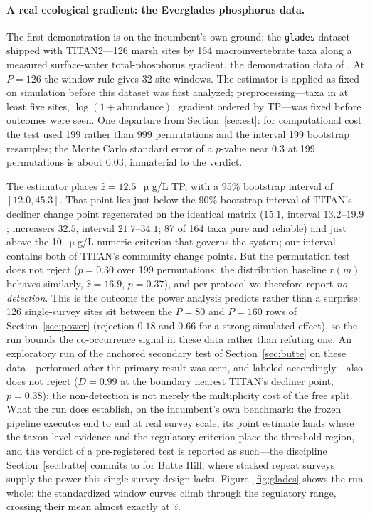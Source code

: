 \documentclass[review,12pt,authoryear]{elsarticle}
\theoremstyle{remark}
\begin{document}
\paragraph{A real ecological gradient: the Everglades phosphorus data.}
The first demonstration is on the incumbent's own ground: the \texttt{glades} dataset shipped with TITAN2---126 marsh sites
by 164 macroinvertebrate taxa along a measured surface-water
total-phosphorus gradient, the demonstration data of \citet{baker2010titan}.
At $P = 126$ the window rule gives 32-site windows. The estimator is applied
as fixed on simulation before this dataset was first analyzed; preprocessing---taxa in at
least five sites, $\log(1+\text{abundance})$, gradient ordered by TP---was
fixed before outcomes were seen. One departure from Section~\ref{sec:est}:
for computational cost the test used 199 rather than 999 permutations and
the interval 199 bootstrap resamples; the Monte Carlo standard error of a
$p$-value near $0.3$ at 199 permutations is about $0.03$, immaterial to the
verdict.

The estimator places $\hat z = 12.5$~$\upmu$g/L TP, with a 95\% bootstrap
interval of $[12.0, 45.3]$. That point lies just below the 90\% bootstrap
interval of TITAN's decliner change point regenerated on the identical matrix
($15.1$, interval $13.2$--$19.9$; increasers $32.5$, interval $21.7$--$34.1$;
87 of 164 taxa pure and reliable) and just above the 10~$\upmu$g/L numeric
criterion that governs the system; our interval contains both of TITAN's
community change points.
But the permutation test does not reject ($p = 0.30$ over 199 permutations;
the distribution baseline $r(m)$ behaves similarly, $\hat z = 16.9$,
$p = 0.37$), and per protocol we therefore report \emph{no detection}. This
is the outcome the power analysis predicts rather than a surprise: 126
single-survey sites sit between the $P = 80$ and $P = 160$ rows of
Section~\ref{sec:power} (rejection $0.18$ and $0.66$ for a strong simulated
effect), so the run bounds the co-occurrence signal in these data rather
than refuting one. An exploratory run of the anchored secondary test of
Section~\ref{sec:butte} on these data---performed after the primary
result was seen, and labeled accordingly---also does not reject ($D = 0.99$
at the boundary nearest TITAN's decliner point, $p = 0.38$): the
non-detection is not merely the multiplicity cost of the free split. What
the run does establish, on the incumbent's own benchmark:
the frozen pipeline executes end to end at real survey scale, its point
estimate lands where the taxon-level evidence and the regulatory criterion
place the threshold region, and the verdict of a pre-registered test is
reported as such---the discipline Section~\ref{sec:butte} commits to for
Butte Hill, where stacked repeat surveys supply the power this
single-survey design lacks. Figure~\ref{fig:glades} shows the run
whole: the standardized window curves climb through the regulatory range,
crossing their mean almost exactly at $\hat z$.
\end{document}
